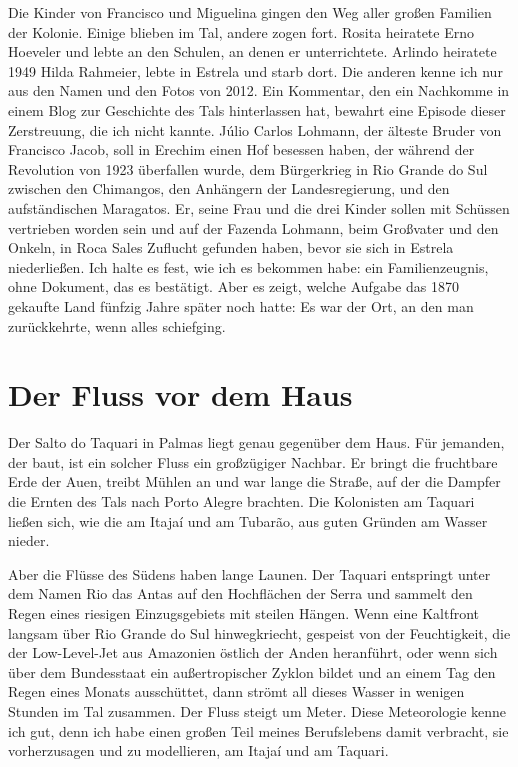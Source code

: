 \documentclass[
  ngerman,
  11pt,
  openany]{book}
\begin{document}
Die Kinder von Francisco und Miguelina gingen den Weg aller großen
Familien der Kolonie. Einige blieben im Tal, andere zogen fort. Rosita
heiratete Erno Hoeveler und lebte an den Schulen, an denen er
unterrichtete. Arlindo heiratete 1949 Hilda Rahmeier, lebte in Estrela
und starb dort. Die anderen kenne ich nur aus den Namen und den Fotos
von 2012. Ein Kommentar, den ein Nachkomme in einem Blog zur Geschichte
des Tals hinterlassen hat, bewahrt eine Episode dieser Zerstreuung, die
ich nicht kannte. Júlio Carlos Lohmann, der älteste Bruder von Francisco
Jacob, soll in Erechim einen Hof besessen haben, der während der
Revolution von 1923 überfallen wurde, dem Bürgerkrieg in Rio Grande do
Sul zwischen den Chimangos, den Anhängern der Landesregierung, und den
aufständischen Maragatos. Er, seine Frau und die drei Kinder sollen mit
Schüssen vertrieben worden sein und auf der Fazenda Lohmann, beim
Großvater und den Onkeln, in Roca Sales Zuflucht gefunden haben, bevor
sie sich in Estrela niederließen. Ich halte es fest, wie ich es bekommen
habe: ein Familienzeugnis, ohne Dokument, das es bestätigt. Aber es
zeigt, welche Aufgabe das 1870 gekaufte Land fünfzig Jahre später noch
hatte: Es war der Ort, an den man zurückkehrte, wenn alles schiefging.

\section{Der Fluss vor dem Haus}\label{der-fluss-vor-dem-haus}

Der Salto do Taquari in Palmas liegt genau gegenüber dem Haus. Für
jemanden, der baut, ist ein solcher Fluss ein großzügiger Nachbar. Er
bringt die fruchtbare Erde der Auen, treibt Mühlen an und war lange die
Straße, auf der die Dampfer die Ernten des Tals nach Porto Alegre
brachten. Die Kolonisten am Taquari ließen sich, wie die am Itajaí und
am Tubarão, aus guten Gründen am Wasser nieder.

Aber die Flüsse des Südens haben lange Launen. Der Taquari entspringt
unter dem Namen Rio das Antas auf den Hochflächen der Serra und sammelt
den Regen eines riesigen Einzugsgebiets mit steilen Hängen. Wenn eine
Kaltfront langsam über Rio Grande do Sul hinwegkriecht, gespeist von der
Feuchtigkeit, die der Low-Level-Jet aus Amazonien östlich der Anden
heranführt, oder wenn sich über dem Bundesstaat ein außertropischer
Zyklon bildet und an einem Tag den Regen eines Monats ausschüttet, dann
strömt all dieses Wasser in wenigen Stunden im Tal zusammen. Der Fluss
steigt um Meter. Diese Meteorologie kenne ich gut, denn ich habe einen
großen Teil meines Berufslebens damit verbracht, sie vorherzusagen und
zu modellieren, am Itajaí und am Taquari.
\end{document}
